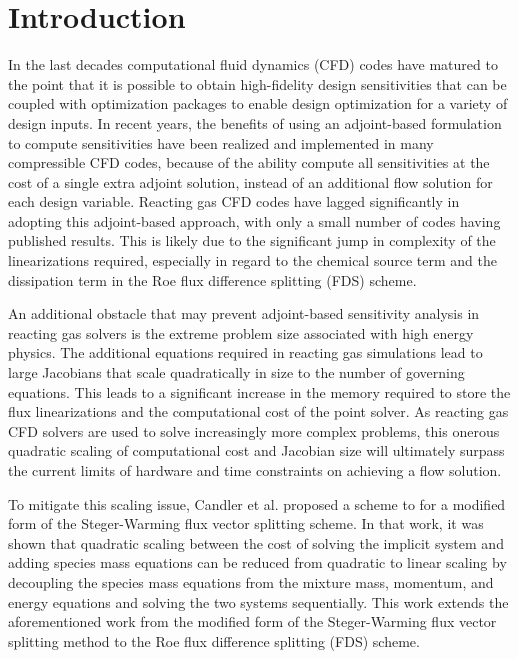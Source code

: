 \chapter{Introduction}
\label{chapter-one}

In the last decades computational fluid dynamics (CFD) codes have matured to the
point that it is possible to obtain high-fidelity design sensitivities that can
be coupled with optimization packages to enable design optimization for a
variety of design inputs\cite{baysal1992aerodynamic, balagangadhar2001design}.
In recent years, the benefits of using an adjoint-based formulation to compute
sensitivities have been realized and implemented in many compressible CFD
codes\cite{mavriplis-2006, nemec-aftosmis-adjoint, nielsen2002recent}, because
of the ability compute all sensitivities at the cost of a single extra adjoint
solution, instead of an additional flow solution for each design variable.
Reacting gas CFD codes have lagged significantly in adopting this adjoint-based
approach, with only a small number of codes having published
results\cite{Copeland, Barcelona}.  This is likely due to the significant
jump in complexity of the linearizations required, especially in regard to the
chemical source term and the dissipation term in the Roe flux difference
splitting (FDS) scheme\cite{roe}.

An additional obstacle that may prevent adjoint-based sensitivity analysis in
reacting gas solvers is the extreme problem size associated with high energy
physics.  The additional equations required in reacting gas simulations lead to
large Jacobians that scale quadratically in size to the number of governing
equations.  This leads to a significant increase in the memory required to store
the flux linearizations and the computational cost of the point solver.  As
reacting gas CFD solvers are used to solve increasingly more complex problems,
this onerous quadratic scaling of computational cost and Jacobian size will
ultimately surpass the current limits of hardware and time constraints on
achieving a flow solution\cite{fischer}.

To mitigate this scaling issue, Candler et al.\cite{candler} proposed a scheme
to for a modified form of the Steger-Warming flux vector splitting
scheme\cite{MacCormack,Steger}. In that work, it was shown that quadratic
scaling between the cost of solving the implicit system and adding species mass
equations can be reduced from quadratic to linear scaling by decoupling the
species mass equations from the mixture mass, momentum, and energy equations and
solving the two systems sequentially.  This work extends the aforementioned work
from the modified form of the Steger-Warming flux vector splitting
method to the Roe flux difference splitting (FDS) scheme.

